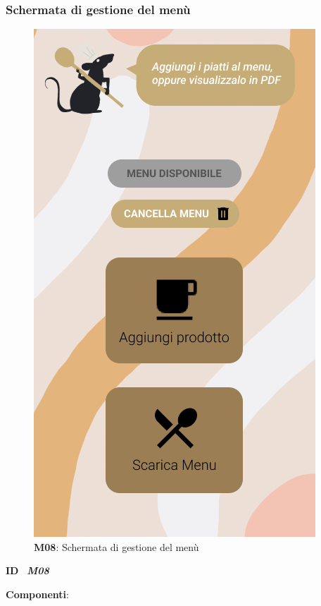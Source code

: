         \subsubsection{Schermata di gestione del menù}
        \begin{figure}[H]
            \centering
            \includegraphics[scale=0.35]{assets/Mockup/Mockup_MenuManager.png}
            \caption{\textbf{M08}: Schermata di gestione del menù}\label{fig:Mockup_MenuManager}
        \end{figure}
        \begin{flushleft}
            \textbf{ID} \ \Large{\textit{\textbf{M08}}}
        \end{flushleft}
        \textbf{Componenti}:

